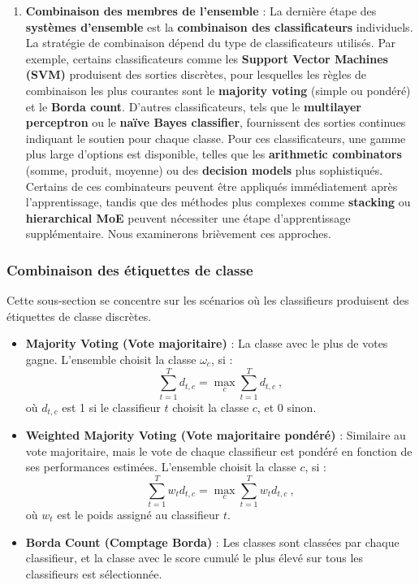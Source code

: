 \begin{enumerate}
	\item \textbf{Combinaison des membres de l'ensemble} : 
	\qquad La dernière étape des \textbf{systèmes d'ensemble} est la \textbf{combinaison des classificateurs} individuels. La stratégie de combinaison dépend du type de classificateurs utilisés. Par exemple, certains classificateurs comme les \textbf{Support Vector Machines (SVM)} produisent des sorties discrètes, pour lesquelles les règles de combinaison les plus courantes sont le \textbf{majority voting} (simple ou pondéré) et le \textbf{Borda count}. D'autres classificateurs, tels que le \textbf{multilayer perceptron} ou le \textbf{naïve Bayes classifier}, fournissent des sorties continues indiquant le soutien pour chaque classe. Pour ces classificateurs, une gamme plus large d'options est disponible, telles que les \textbf{arithmetic combinators} (somme, produit, moyenne) ou des \textbf{decision models} plus sophistiqués. Certains de ces combinateurs peuvent être appliqués immédiatement après l'apprentissage, tandis que des méthodes plus complexes comme \textbf{stacking} ou \textbf{hierarchical MoE} peuvent nécessiter une étape d'apprentissage supplémentaire. Nous examinerons brièvement ces approches.
\end{enumerate}

\subsubsection*{Combinaison des étiquettes de classe}
Cette sous-section se concentre sur les scénarios où les classifieurs produisent des étiquettes de classe discrètes.

\begin{itemize}
	\item \textbf{Majority Voting (Vote majoritaire)} : La classe avec le plus de votes gagne. L'ensemble choisit la classe $\omega_c$, si :
	\[
	\sum_{t=1}^{T} d_{t,c} = \max_{c} \sum_{t=1}^{T} d_{t,c}~,
	\]
	où $d_{t,c}$ est 1 si le classifieur $t$ choisit la classe $c$, et 0 sinon.
	
	\item \textbf{Weighted Majority Voting (Vote majoritaire pondéré)} : Similaire au vote majoritaire, mais le vote de chaque classifieur est pondéré en fonction de ses performances estimées. L'ensemble choisit la classe $c$, si :
	\[
	\sum_{t=1}^{T} w_t d_{t,c} = \max_{c} \sum_{t=1}^{T} w_t d_{t,c}~,
	\]
	où $w_t$ est le poids assigné au classifieur $t$.
	
	\item \textbf{Borda Count (Comptage Borda)} : Les classes sont classées par chaque classifieur, et la classe avec le score cumulé le plus élevé sur tous les classifieurs est sélectionnée.
\end{itemize}


